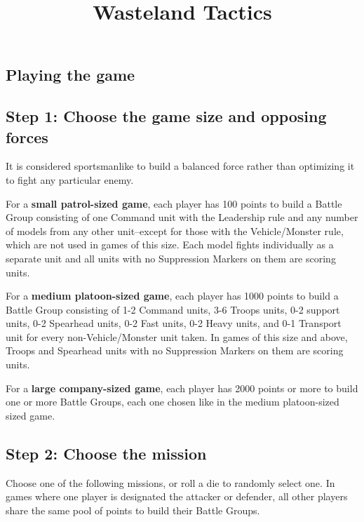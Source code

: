 








\title{Wasteland Tactics}

\begin{titlepage}
\maketitle
\end{titlepage}

\begin{multicols}{2}

\chapter*{Playing the game}

\section*{Step 1: Choose the game size and opposing forces}
It is considered sportsmanlike to build a balanced force rather than optimizing it to fight any particular enemy.

For a \textbf{small patrol-sized game}, each player has 100 points to build a Battle Group consisting of one Command unit with the Leadership rule and any number of models from any other unit--except for those with the Vehicle/Monster rule, which are not used in games of this size. Each model fights individually as a separate unit and all units with no Suppression Markers on them are scoring units.

For a \textbf{medium platoon-sized game}, each player has 1000 points to build a Battle Group consisting of 1-2 Command units, 3-6 Troops units, 0-2 support units, 0-2 Spearhead units, 0-2 Fast units, 0-2 Heavy units, and 0-1 Transport unit for every non-Vehicle/Monster unit taken. In games of this size and above, Troops and Spearhead units with no Suppression Markers on them are scoring units.

For a \textbf{large company-sized game}, each player has 2000 points or more to build one or more Battle Groups, each one chosen like in the medium platoon-sized sized game.




\section*{Step 2: Choose the mission}
Choose one of the following missions, or roll a die to randomly select one. In games where one player is designated the attacker or defender, all other players share the same pool of points to build their Battle Groups.


\end{multicols}
